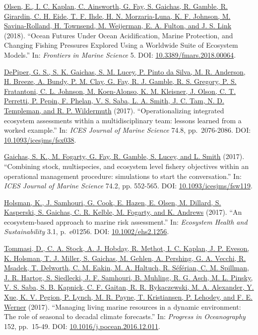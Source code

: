 \documentclass[11pt, a4paper]{awesome-cv}
\begin{document}
\protect\hyperlink{cite-olsen_ocean_2018}{Olsen, E., I. C. Kaplan, C.
Ainsworth, G. Fay, S. Gaichas, R. Gamble, R. Girardin, C. H. Eide, T. F.
Ihde, H. N. Morzaria-Luna, K. F. Johnson, M. Savina-Rolland, H.
Townsend, M. Weijerman, E. A. Fulton, and J. S. Link} (2018). ``Ocean
Futures Under Ocean Acidification, Marine Protection, and Changing
Fishing Pressures Explored Using a Worldwide Suite of Ecosystem
Models.'' In: \emph{Frontiers in Marine Science} 5. DOI:
\href{https://doi.org/10.3389\%2Ffmars.2018.00064}{10.3389/fmars.2018.00064}.

\protect\hyperlink{cite-depiper_operationalizing_2017}{DePiper, G. S.,
S. K. Gaichas, S. M. Lucey, P. Pinto da Silva, M. R. Anderson, H.
Breeze, A. Bundy, P. M. Clay, G. Fay, R. J. Gamble, R. S. Gregory, P. S.
Fratantoni, C. L. Johnson, M. Koen-Alonso, K. M. Kleisner, J. Olson, C.
T. Perretti, P. Pepin, F. Phelan, V. S. Saba, L. A. Smith, J. C. Tam, N.
D. Templeman, and R. P. Wildermuth} (2017). ``Operationalizing
integrated ecosystem assessments within a multidisciplinary team:
lessons learned from a worked example.'' In: \emph{ICES Journal of
Marine Science} 74.8, pp.~2076-2086. DOI:
\href{https://doi.org/10.1093\%2Ficesjms\%2Ffsx038}{10.1093/icesjms/fsx038}.

\protect\hyperlink{cite-gaichas_combining_2017}{Gaichas, S. K., M.
Fogarty, G. Fay, R. Gamble, S. Lucey, and L. Smith} (2017). ``Combining
stock, multispecies, and ecosystem level fishery objectives within an
operational management procedure: simulations to start the
conversation.'' In: \emph{ICES Journal of Marine Science} 74.2, pp.
552-565. DOI:
\href{https://doi.org/10.1093\%2Ficesjms\%2Ffsw119}{10.1093/icesjms/fsw119}.

\protect\hyperlink{cite-holsman_ecosystem-based_2017}{Holsman, K., J.
Samhouri, G. Cook, E. Hazen, E. Olsen, M. Dillard, S. Kasperski, S.
Gaichas, C. R. Kelble, M. Fogarty, and K. Andrews} (2017). ``An
ecosystem-based approach to marine risk assessment.'' In:
\emph{Ecosystem Health and Sustainability} 3.1, p.~e01256. DOI:
\href{https://doi.org/10.1002\%2Fehs2.1256}{10.1002/ehs2.1256}.

\protect\hyperlink{cite-tommasi_managing_2017}{Tommasi, D., C. A. Stock,
A. J. Hobday, R. Methot, I. C. Kaplan, J. P. Eveson, K. Holsman, T. J.
Miller, S. Gaichas, M. Gehlen, A. Pershing, G. A. Vecchi, R. Msadek, T.
Delworth, C. M. Eakin, M. A. Haltuch, R. Séférian, C. M. Spillman, J. R.
Hartog, S. Siedlecki, J. F. Samhouri, B. Muhling, R. G. Asch, M. L.
Pinsky, V. S. Saba, S. B. Kapnick, C. F. Gaitan, R. R. Rykaczewski, M.
A. Alexander, Y. Xue, K. V. Pegion, P. Lynch, M. R. Payne, T.
Kristiansen, P. Lehodey, and F. E. Werner} (2017). ``Managing living
marine resources in a dynamic environment: The role of seasonal to
decadal climate forecasts.'' In: \emph{Progress in Oceanography} 152,
pp.~15-49. DOI:
\href{https://doi.org/10.1016\%2Fj.pocean.2016.12.011}{10.1016/j.pocean.2016.12.011}.
\end{document}
